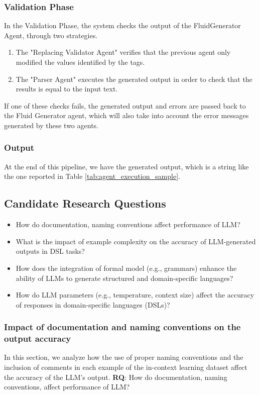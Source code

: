 \subsubsection{Validation Phase}
In the Validation Phase, the system checks the output of the FluidGenerator Agent, through two strategies.
\begin{enumerate}
    \item The "Replacing Validator Agent" verifies that the previous agent only modified the values identified by the tags.
    \item The "Parser Agent" executes the generated output in order to check that the results is equal to the input text.
\end{enumerate}

If one of these checks fails, the generated output and errors are passed back to the Fluid Generator agent, which will also take into account the error messages generated by these two agents.

\subsubsection{Output}

At the end of this pipeline, we have the generated output, which is a string like the one reported in Table \ref{tab:agent_execution_sample}.


\subsection{Candidate Research Questions}

\begin{itemize}
    \item How do documentation, naming conventions affect performance of LLM?
    \item What is the impact of example complexity on the accuracy of LLM-generated outputs in DSL tasks?
    \item How does the integration of formal model (e.g., grammars) enhance the ability of LLMs to generate structured and domain-specific languages?
    \item How do LLM parameters (e.g., temperature, context size) affect the accuracy of responses in domain-specific languages (DSLs)?
\end{itemize}

\subsubsection{Impact of documentation and naming conventions on the output accuracy}
In this section, we analyze how the use of proper naming conventions and the inclusion of comments in each example of the in-context learning dataset affect the accuracy of the LLM's output.
\textbf{RQ}: How do documentation, naming conventions, affect performance of LLM?


